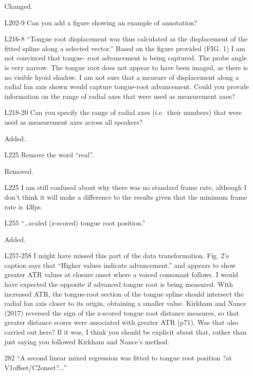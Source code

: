 \documentclass[]{article}
\begin{document}
\color{plum}

Changed. \color{black}

L202-9 Can you add a figure showing an example of annotation?

L216-8 ``Tongue root displacement was thus calculated as the
displacement of the fitted spline along a selected vector.'' Based on
the figure provided (FIG. 1) I am not convinced that tongue- root
advancement is being captured. The probe angle is very narrow. The
tongue root does not appear to have been imaged, as there is no visible
hyoid shadow. I am not sure that a measure of displacement along a
radial fan axis shown would capture tongue-root advancement. Could you
provide information on the range of radial axes that were used as
measurement axes?

L218-20 Can you specify the range of radial axes (i.e.~their numbers)
that were used as measurement axes across all speakers?

\color{plum}

Added. \color{black}

L225 Remove the word ``real''.

\color{plum}

Removed. \color{black}

L225 I am still confused about why there was no standard frame rate,
although I don't think it will make a difference to the results given
that the minimum frame rate is 43fps.

L255 ``\ldots{}scaled (z-scored) tongue root position.''

\color{plum}

Added. \color{black}

L257-258 I might have missed this part of the data transformation. Fig.
2's caption says that ``Higher values indicate advancement.'' and
appears to show greater ATR values at closure onset where a voiced
consonant follows. I would have expected the opposite if advanced tongue
root is being measured. With increased ATR, the tongue-root section of
the tongue spline should intersect the radial fan axis closer to its
origin, obtaining a smaller value. Kirkham and Nance (2017) reversed the
sign of the z-scored tongue root distance measures, so that greater
distance scores were associated with greater ATR (p71). Was that also
carried out here? If it was, I think you should be explicit about that,
rather than just saying you followed Kirkham and Nance's method.

282 ``A second linear mixed regression was fitted to tongue root
position ?at V1offset/C2onset?\ldots{}''
\end{document}
